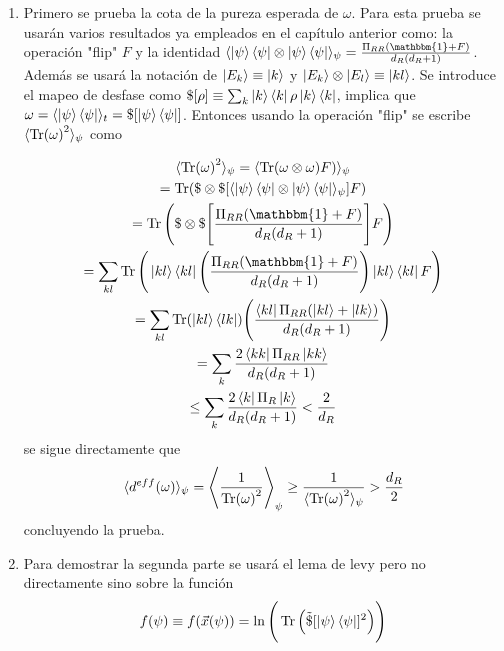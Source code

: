 \begin{enumerate}
\item
Primero se prueba la cota de la pureza esperada de $\omega$. Para esta prueba se usarán varios resultados ya empleados en el capítulo anterior como: la operación "flip"  $F$ y la identidad $\langle \ket{\psi} \bra{\psi} \otimes \ket{\psi} \bra{\psi} \rangle_{\psi} =  \frac{\Pi_{RR}(\mathbbm{1}+F)}{d_{R}(d_{R}+1)}$. Además se usará la notación de $ \ket{E_{k}} \equiv \ket{k}$ y $\ket{E_{k}} \otimes \ket{E_{l}} \equiv \ket{kl}$. Se introduce el mapeo de desfase como $ \$[ \rho ] \equiv  \sum_{k} \ket{k} \bra{k} \rho \ket{k}\bra{k}$, implica que $\omega= \langle \ket{\psi}\bra{\psi} \rangle_{t}= \$ [\ket{\psi}\bra{\psi}]$. Entonces usando la operación "flip"  se escribe $\langle \Tr (\omega)^{2} \rangle_{\psi}$ como
 
\begin{multline}
\langle \Tr (\omega)^{2} \rangle_{\psi} = \langle \Tr(\omega \otimes \omega)F) \rangle_{\psi}\\
= \Tr(\$ \otimes \$ [ \langle \ket{\psi} \bra{\psi} \otimes \ket{\psi} \bra{\psi} \rangle_{\psi}]F)\\
=\Tr \Bigg( \$ \otimes \$ \Bigg[ \frac{\Pi_{RR}(\mathbbm{1}+F)}{d_{R}(d_{R}+1)} \Bigg]F \Bigg)\\
= \sum_{kl} \Tr \Bigg(  \ket{kl}\bra{kl}  \Bigg(  \frac{\Pi_{RR}(\mathbbm{1}+F)}{d_{R}(d_{R}+1)} \Bigg) \ket{kl}\bra{kl} F \Bigg)\\
=\sum_{kl} \Tr ( \ket{kl}\bra{lk} ) \Bigg( \frac{\bra{kl} \Pi_{RR}(\ket{kl}+\ket{lk})}{d_{R}(d_{R}+1)}  \Bigg)\\
=\sum_{k} \frac{2 \bra{kk} \Pi_{RR}\ket{kk}}{d_{R}(d_{R}+1)} \\
\leq \sum_{k} \frac{2 \bra{k} \Pi_{R}\ket{k}}{d_{R}(d_{R}+1)} < \frac{2}{d_{R}}
\end{multline}
se sigue directamente que 
\begin{equation}
\langle d^{eff}(\omega) \rangle_{\psi} = \Bigg \langle \frac{1}{\Tr (\omega)^{2}} \Bigg \rangle_{\psi} \geq \frac{1}{\langle \Tr (\omega)^{2} \rangle_{\psi}} > \frac{d_{R}}{2}
\end{equation}
concluyendo la prueba.
\item
Para demostrar la segunda parte se usará el lema de levy pero no directamente sino sobre la función 
\begin{equation}
f(\psi) \equiv f(\vec{x}(\psi)) = \ln \Bigg( \Tr \Big( \tilde{\$}[ \ket{\psi}\bra{\psi}]^{2} \Big) \Bigg)
\end{equation}


\end{enumerate}
